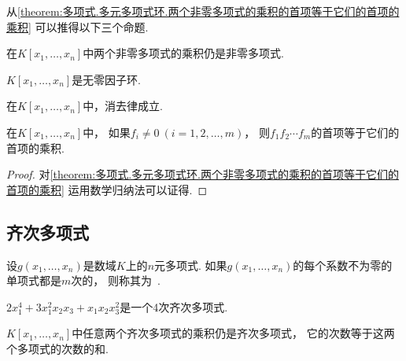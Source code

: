 从\cref{theorem:多项式.多元多项式环.两个非零多项式的乘积的首项等于它们的首项的乘积}
可以推得以下三个命题.

\begin{proposition}
在\(K[x_1,\dotsc,x_n]\)中两个非零多项式的乘积仍是非零多项式.
\end{proposition}

\begin{proposition}
\(K[x_1,\dotsc,x_n]\)是无零因子环.
\end{proposition}

\begin{proposition}
在\(K[x_1,\dotsc,x_n]\)中，消去律成立.
\end{proposition}

\begin{corollary}
在\(K[x_1,\dotsc,x_n]\)中，
如果\(f_i\neq0\ (i=1,2,\dotsc,m)\)，
则\(f_1 f_2 \dotsm f_m\)的首项等于它们的首项的乘积.
\begin{proof}
对\cref{theorem:多项式.多元多项式环.两个非零多项式的乘积的首项等于它们的首项的乘积}
运用数学归纳法可以证得.
\end{proof}
\end{corollary}

\subsection{齐次多项式}
\begin{definition}
设\(g(x_1,\dotsc,x_n)\)是数域\(K\)上的\(n\)元多项式.
如果\(g(x_1,\dotsc,x_n)\)的每个系数不为零的单项式都是\(m\)次的，
则称其为~.
\end{definition}

\begin{example}
\(2x_1^4+3x_1^2x_2x_3+x_1x_2x_3^2\)是一个4次齐次多项式.
\end{example}

\begin{proposition}
\(K[x_1,\dotsc,x_n]\)中任意两个齐次多项式的乘积仍是齐次多项式，
它的次数等于这两个多项式的次数的和.
\end{proposition}
